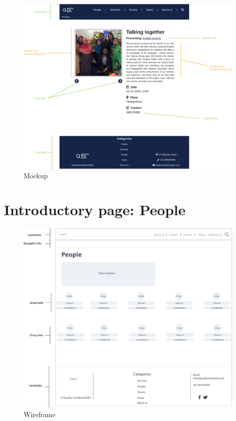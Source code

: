 \documentclass[a4paper, 11pt, parskip=half, headsepline]{scrreprt}
\begin{document}
\begin{figure}[H]
    \centering
    \includegraphics[width=1\linewidth, keepaspectratio]{mockups/ConcreteEventTalking}
    \caption{Mockup}
\end{figure}

\section{Introductory page: People}

\begin{figure}[H]
    \centering
    \includegraphics[width=1\linewidth, keepaspectratio]{wireframes/Introductory-People}
    \caption{Wireframe}
\end{figure}
\end{document}
